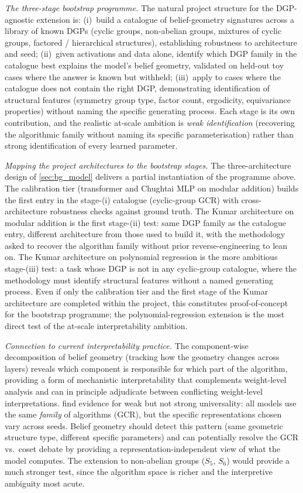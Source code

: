 \documentclass[11pt,a4paper]{article}
\begin{document}
\emph{The three-stage bootstrap programme.} The natural project structure for the DGP-agnostic extension is: (i)~build a catalogue of belief-geometry signatures across a library of known DGPs (cyclic groups, non-abelian groups, mixtures of cyclic groups, factored / hierarchical structures), establishing robustness to architecture and seed; (ii)~given activations and data alone, identify which DGP family in the catalogue best explains the model's belief geometry, validated on held-out toy cases where the answer is known but withheld; (iii)~apply to cases where the catalogue does not contain the right DGP, demonstrating identification of structural features (symmetry group type, factor count, ergodicity, equivariance properties) without naming the specific generating process. Each stage is its own contribution, and the realistic at-scale ambition is \emph{weak identification} (recovering the algorithmic family without naming its specific parameterisation) rather than strong identification of every learned parameter.

\emph{Mapping the project architectures to the bootstrap stages.} The three-architecture design of \cref{sec:bg_model} delivers a partial instantiation of the programme above. The calibration tier (transformer and Chughtai MLP on modular addition) builds the first entry in the stage-(i) catalogue (cyclic-group GCR) with cross-architecture robustness checks against ground truth. The Kumar architecture on modular addition is the first stage-(ii) test: same DGP family as the catalogue entry, different architecture from those used to build it, with the methodology asked to recover the algorithm family without prior reverse-engineering to lean on. The Kumar architecture on polynomial regression is the more ambitious stage-(iii) test: a task whose DGP is not in any cyclic-group catalogue, where the methodology must identify structural features without a named generating process. Even if only the calibration tier and the first stage of the Kumar architecture are completed within the project, this constitutes proof-of-concept for the bootstrap programme; the polynomial-regression extension is the most direct test of the at-scale interpretability ambition.

\emph{Connection to current interpretability practice.} The component-wise decomposition of belief geometry (tracking how the geometry changes across layers) reveals which component is responsible for which part of the algorithm, providing a form of mechanistic interpretability that complements weight-level analysis and can in principle adjudicate between conflicting weight-level interpretations. \citet{chughtai2023toy} find evidence for weak but not strong universality: all models use the same \emph{family} of algorithms (GCR), but the specific representations chosen vary across seeds. Belief geometry should detect this pattern (same geometric structure type, different specific parameters) and can potentially resolve the GCR vs.\ coset debate by providing a representation-independent view of what the model computes. The extension to non-abelian groups ($S_5$, $S_6$) would provide a much stronger test, since the algorithm space is richer and the interpretive ambiguity most acute.
\end{document}
